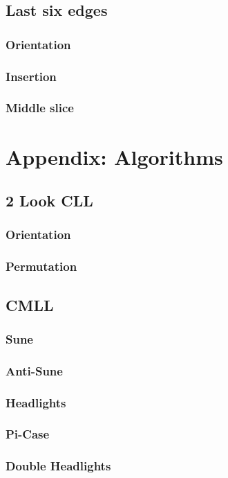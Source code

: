 \documentclass[a4paper]{scrreprt}
\begin{document}
\section{Last six edges}


\subsection{Orientation}
\subsection{Insertion}
\subsection{Middle slice}


\chapter{Appendix: Algorithms}

\section{2 Look CLL}
\subsection{Orientation}
\subsection{Permutation}

\section{CMLL}
\subsection{Sune}
\subsection{Anti-Sune}
\subsection{Headlights}
\subsection{Pi-Case}
\subsection{Double Headlights}
\end{document}
